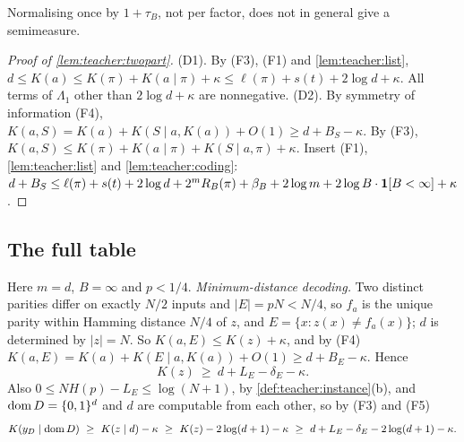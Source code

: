 Normalising once by $1+\tau_B$, not per factor, does not in general give a semimeasure.

\begin{proof}[Proof of \cref{lem:teacher:twopart}]
(D1). By (F3), (F1) and \cref{lem:teacher:list}, $d\le K(a)\le K(\pi)+K(a\mid\pi)+\kappa\le\ell(\pi)+s(t)+2\log d+\kappa$. All terms of $\Lambda_1$ other than $2\log d+\kappa$ are nonnegative.
(D2). By symmetry of information (F4), $K(a,S)=K(a)+K(S\mid a,K(a))+O(1)\ge d+B_S-\kappa$. By (F3), $K(a,S)\le K(\pi)+K(a\mid\pi)+K(S\mid a,\pi)+\kappa$. Insert (F1), \cref{lem:teacher:list} and \cref{lem:teacher:coding}: $d+B_S\le\ell(\pi)+s(t)+2\log d+2^mR_B(\pi)+\beta_B+2\log m+2\log B\cdot\mathbf{1}[B<\infty]+\kappa$.
\end{proof}

\subsection{The full table}\label{app:parity:kink}

Here $m=d$, $B=\infty$ and $p<1/4$. \emph{Minimum-distance decoding.} Two distinct parities differ on exactly $N/2$ inputs and $|E|=pN<N/4$, so $f_a$ is the unique parity within Hamming distance $N/4$ of $z$, and $E=\{x:z(x)\ne f_a(x)\}$; $d$ is determined by $|z|=N$. So $K(a,E)\le K(z)+\kappa$, and by (F4) $K(a,E)=K(a)+K(E\mid a,K(a))+O(1)\ge d+B_E-\kappa$. Hence
\begin{equation}\label{eq:parity:decoding}
K(z)\ \ge\ d+L_E-\delta_E-\kappa .
\end{equation}
Also $0\le NH(p)-L_E\le\log(N+1)$, by \cref{def:teacher:instance}(b), and $\operatorname{dom} D=\{0,1\}^d$ and $d$ are computable from each other, so by (F3) and (F5)
\begin{equation}\label{eq:parity:conditional}
K(y_D\mid\dom D)\ \ge\ K(z\mid d)-\kappa\ \ge\ K(z)-2\log(d+1)-\kappa\ \ge\ d+L_E-\delta_E-2\log(d+1)-\kappa .
\end{equation}

